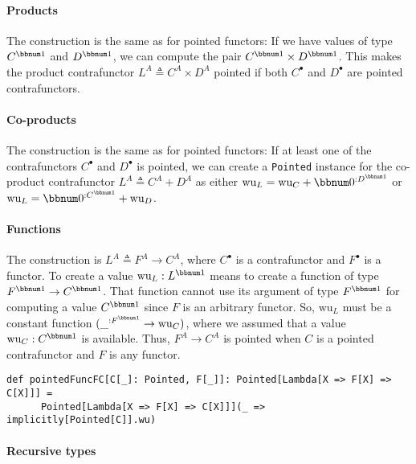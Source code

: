 \paragraph{Products}

The construction is the same as for pointed functors: If we have values
of type $C^{\bbnum 1}$ and $D^{\bbnum 1}$, we can compute the pair
$C^{\bbnum 1}\times D^{\bbnum 1}$. This makes the product contrafunctor
$L^{A}\triangleq C^{A}\times D^{A}$ pointed if both $C^{\bullet}$
and $D^{\bullet}$ are pointed contrafunctors.

\paragraph{Co-products}

The construction is the same as for pointed functors: If at least
one of the contrafunctors $C^{\bullet}$ and $D^{\bullet}$ is pointed,
we can create a \lstinline!Pointed! instance for the co-product contrafunctor
$L^{A}\triangleq C^{A}+D^{A}$ as either $\text{wu}_{L}=\text{wu}_{C}+\bbnum 0^{:D^{\bbnum 1}}$
or $\text{wu}_{L}=\bbnum 0^{:C^{\bbnum 1}}+\text{wu}_{D}$.

\paragraph{Functions}

The construction is $L^{A}\triangleq F^{A}\rightarrow C^{A}$, where
$C^{\bullet}$ is a contrafunctor and $F^{\bullet}$ is a functor.
To create a value $\text{wu}_{L}:L^{\bbnum 1}$ means to create a
function of type $F^{\bbnum 1}\rightarrow C^{\bbnum 1}$. That function
cannot use its argument of type $F^{\bbnum 1}$ for computing a value
$C^{\bbnum 1}$ since $F$ is an arbitrary functor. So, $\text{wu}_{L}$
must be a constant function $(\_^{:F^{\bbnum 1}}\rightarrow\text{wu}_{C})$,
where we assumed that a value $\text{wu}_{C}:C^{\bbnum 1}$ is available.
Thus, $F^{A}\rightarrow C^{A}$ is pointed when $C$ is a pointed
contrafunctor and $F$ is any functor.
\begin{lstlisting}
def pointedFuncFC[C[_]: Pointed, F[_]]: Pointed[Lambda[X => F[X] => C[X]]] =
      Pointed[Lambda[X => F[X] => C[X]]](_ => implicitly[Pointed[C]].wu)
\end{lstlisting}


\paragraph{Recursive types}

